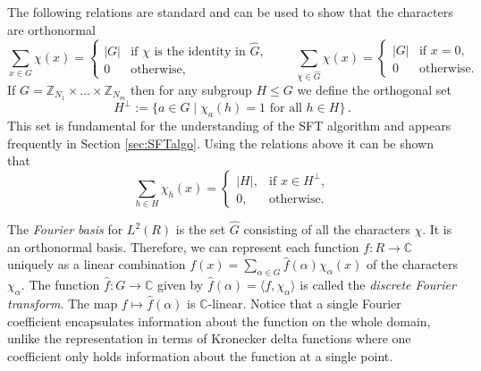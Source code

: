 \documentclass[11pt]{article}
\theoremstyle{definition}
\newcommand{\Z}{\mathbb{Z}}
\newcommand{\C}{\mathbb{C}}
\begin{document}
The following relations are standard and can be used to show that the characters are orthonormal
\[
    \sum_{x\in G}\chi(x)=
    \begin{cases}
        |G| & \text{if }\chi \text{ is the identity in }\widehat{G}, \\
        0   & \text{otherwise},
    \end{cases}
    \quad \quad
    \sum_{\chi\in \widehat{G}}\chi(x)=
    \begin{cases}
        |G| & \text{if }x=0,    \\
        0   & \text{otherwise}.
    \end{cases}
\]
If $G =\Z_{N_1} \times \ldots \times \Z_{N_m}$ then for any subgroup $H \leq G$ we define the orthogonal set
\begin{equation}\label{eq_Hperp}
    H^\perp := \{a\in G\mid \chi_a(h) = 1 \text{ for all }h\in H\} \,.
\end{equation}
This  set is fundamental for the understanding of the SFT algorithm and appears frequently in Section \ref{sec:SFTalgo}. Using the relations above it can be shown that
\begin{equation}\label{eq:Hexp}
    \sum_{h\in H}\chi_h(x) = \begin{cases} |H|, & \text{if }x\in H^\perp, \\ 0, &\text{otherwise}.\end{cases}
\end{equation}


The \emph{Fourier basis} for $L^2(R)$ is the set $\widehat{G}$ consisting of all the characters $\chi$.
It is an orthonormal basis. Therefore, we can represent each function $f: R \rightarrow \C$ uniquely as a linear combination $f(x) = \sum_{\alpha \in G} \widehat{f}(\alpha) \chi_\alpha(x)$ of the characters $\chi_\alpha$.
The function $\widehat{f}:G\to \C$ given by $\widehat{f}( \alpha ) = \langle f,\chi_\alpha \rangle$ is called the \emph{discrete Fourier transform}.
The map $f \mapsto \widehat{f}(\alpha)$ is $\C$-linear.
Notice that a single Fourier coefficient encapsulates information about the function on the whole domain, unlike the representation in terms of Kronecker delta functions where one coefficient only holds information about the function at a single point.
\end{document}
